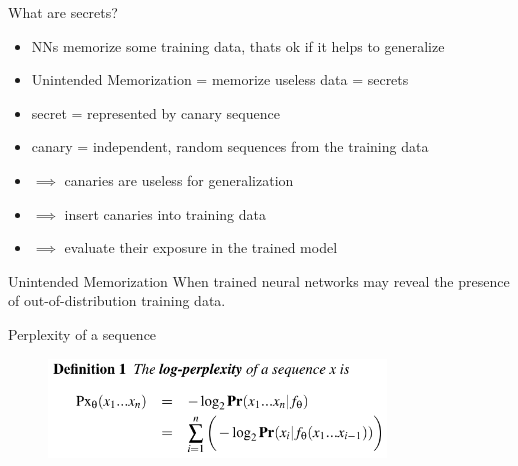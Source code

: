 \documentclass{beamer}
\begin{document}
\begin{frame}{What are secrets?}

\begin{itemize}
\item NNs memorize some training data, thats ok if it helps to generalize
\item Unintended Memorization = memorize useless data = secrets
\item secret = represented by canary sequence
\item canary = independent, random sequences from the training data
\item $\implies$ canaries are useless for generalization 
\item $\implies$ insert canaries into training data
\item $\implies$ evaluate their exposure in the trained model
\end{itemize}

\vfill

\begin{block}{Unintended Memorization}
When trained neural networks may reveal the presence of out-of-distribution training data.
\end{block}

\end{frame}
\begin{frame}{Perplexity of a sequence}

\begin{figure}[h]
\includegraphics[width=0.8\textwidth]{img/log-perp}
\end{figure}

\end{frame}
\end{document}
